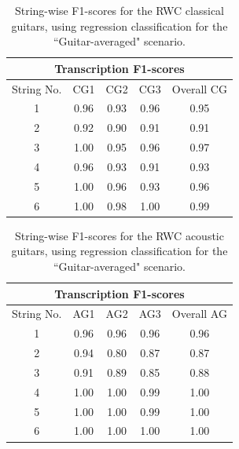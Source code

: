\documentclass[convention,peer-reviewed]{aesconf}
\begin{document}
\begin{table}[!h]
\begin{center}
\begin{tabular}{||c|c|c|c|c||}
\hline
\multicolumn{5}{||c||}{\bf{Transcription F1-scores}} \\
\hline
String No. & CG1 & CG2 & CG3 & Overall CG \\
\hline
1 & 0.96 & 0.93 & 0.96 & 0.95\\
\hline
2 & 0.92 & 0.90 & 0.91 & 0.91\\
\hline
3 & 1.00 & 0.95 & 0.96 & 0.97\\
\hline
4 & 0.96 & 0.93 & 0.91 & 0.93\\
\hline
5 & 1.00 & 0.96 & 0.93 & 0.96 \\
\hline
6 & 1.00 & 0.98 & 1.00 & 0.99\\ 
\hline
\hline
\end{tabular}
\caption{String-wise F1-scores for the RWC classical guitars, using regression classification for the ``Guitar-averaged" scenario.} 
\label{tab:cg-str-f}
\end{center}
\end{table}

\begin{table}[!h]
\begin{center}
\begin{tabular}{||c||c|c|c|c||}
\hline
\multicolumn{5}{||c||}{\bf{Transcription F1-scores}} \\
\hline
String No. & AG1 & AG2 & AG3 & Overall AG \\
\hline
1 &  0.96 & 0.96 & 0.96 & 0.96 \\
\hline
2 & 0.94 & 0.80 & 0.87 &  0.87\\
\hline
3 & 0.91 & 0.89 & 0.85 & 0.88\\
\hline
4 & 1.00 & 1.00 & 0.99 &  1.00 \\
\hline
5 & 1.00 & 1.00 & 0.99 &  1.00 \\
\hline
6 & 1.00 & 1.00 & 1.00 & 1.00 \\ 
\hline
\hline
\end{tabular}
\caption{String-wise F1-scores for the RWC acoustic guitars, using regression classification for the ``Guitar-averaged" scenario.} 
\label{tab:ag-str-f}
\end{center}
\end{table}
\end{document}
